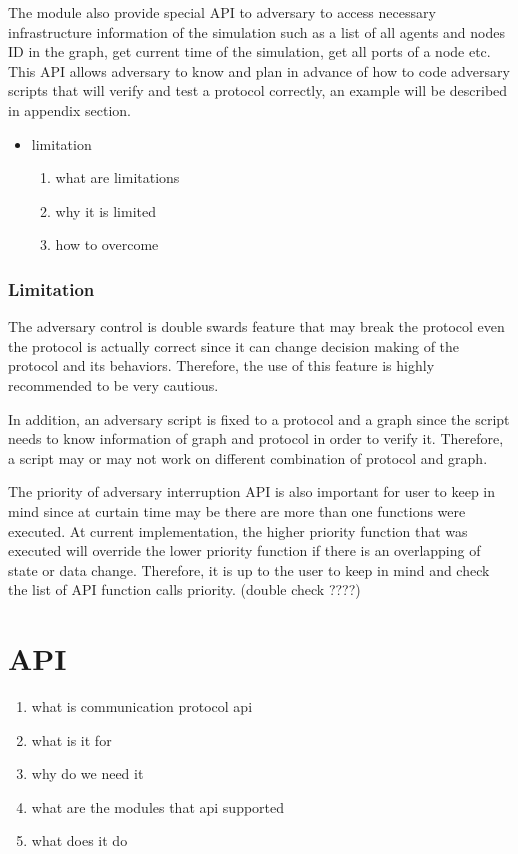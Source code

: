The module also provide special API to adversary to access necessary infrastructure information of the simulation such as a list of all agents and nodes ID in the graph, get current time of the simulation, get all ports of a node etc. This API allows adversary to know and plan in advance of how to code adversary scripts that will verify and test a protocol correctly, an example will be described in appendix section.

\begin{itemize}
\item limitation
    \begin{enumerate}
    \item what are limitations
    \item why it is limited
    \item how to overcome
    \end{enumerate}
\end{itemize}

\subsubsection*{Limitation}

The adversary control is double swards feature that may break the protocol even the protocol is actually correct since it can change decision making of the protocol and its behaviors. Therefore, the use of this feature is highly recommended to be very cautious.

In addition, an adversary script is fixed to a protocol and a graph since the script needs to know information of graph and protocol in order to verify it. Therefore, a script may or may not work on different combination of protocol and graph.

The priority of adversary interruption API is also important for user to keep in mind since at curtain time may be there are more than one functions were executed. At current implementation, the higher priority function that was executed will override the lower priority function if there is an overlapping of state or data change. Therefore, it is up to the user to keep in mind and check the list of API function calls priority. (double check ????)



\section{API}
\begin{enumerate}
\item what is communication protocol api
\item what is it for
\item why do we need it

\item what are the modules that api supported
\item what does it do
\end{enumerate}


